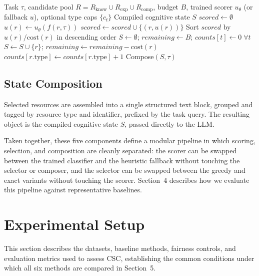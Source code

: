 \documentclass{article}
\begin{document}
\begin{algorithm}[t]
\caption{Cognitive State Compilation}
\begin{algorithmic}[1]
\Require Task $\tau$, candidate pool $R = R_{\text{know}} \cup R_{\text{exp}} \cup R_{\text{comp}}$, budget $B$, trained scorer $u_\theta$ (or fallback $u$), optional type caps $\{c_t\}$
\Ensure Compiled cognitive state $S$
\State $scored \gets \emptyset$
  \State $u(r) \gets u_\theta(f(r, \tau))$
  \State $scored \gets scored \cup \{(r, u(r))\}$
\EndFor
\State Sort $scored$ by $u(r)/\text{cost}(r)$ in descending order
\State $S \gets \emptyset$; $remaining \gets B$; $counts[t] \gets 0 \; \forall t$
    \State $S \gets S \cup \{r\}$; $remaining \gets remaining - \text{cost}(r)$
    \State $counts[r.\text{type}] \gets counts[r.\text{type}] + 1$
  \EndIf
\EndFor
\State \Return Compose$(S, \tau)$
\end{algorithmic}
\end{algorithm}

\subsection{State Composition}

Selected resources are assembled into a single structured text block, grouped and tagged by resource type and identifier, prefixed by the task query. The resulting object is the compiled cognitive state $S$, passed directly to the LLM.

Taken together, these five components define a modular pipeline in which scoring, selection, and composition are cleanly separated: the scorer can be swapped between the trained classifier and the heuristic fallback without touching the selector or composer, and the selector can be swapped between the greedy and exact variants without touching the scorer. Section~4 describes how we evaluate this pipeline against representative baselines.

\section{Experimental Setup}

This section describes the datasets, baseline methods, fairness controls, and evaluation metrics used to assess CSC, establishing the common conditions under which all six methods are compared in Section~5.
\end{document}
